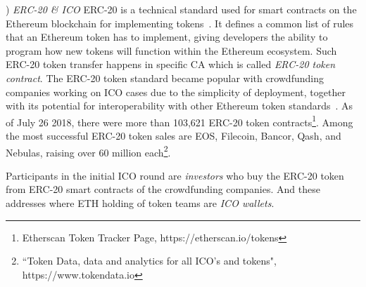 

 



) \emph{ERC-20 \& ICO}
ERC-20 is a technical standard used for smart contracts on the Ethereum blockchain for implementing tokens~\cite{erc-20-wiki}. It defines a common list of rules that an Ethereum token has to implement, giving developers the ability to program how new tokens will function within the Ethereum ecosystem. Such ERC-20 token transfer happens in specific CA which is called \emph{ERC-20 token contract}. The ERC-20 token standard became popular with crowdfunding companies working on ICO cases due to the simplicity of deployment, together with its potential for interoperability with other Ethereum token standards~\cite{erc-20}. As of July 26 2018, there were more than 103,621 ERC-20 token contracts\footnote{Etherscan Token Tracker Page, https://etherscan.io/tokens}. Among the most successful ERC-20 token sales are EOS, Filecoin, Bancor, Qash, and Nebulas, raising over 60 million each\footnote{``Token Data, data and analytics for all ICO's and tokens", https://www.tokendata.io}.

Participants in the initial ICO round are \emph{investors} who buy the ERC-20 token from ERC-20 smart contracts of the crowdfunding companies. And these addresses where ETH holding of token teams are \emph{ICO wallets}.

